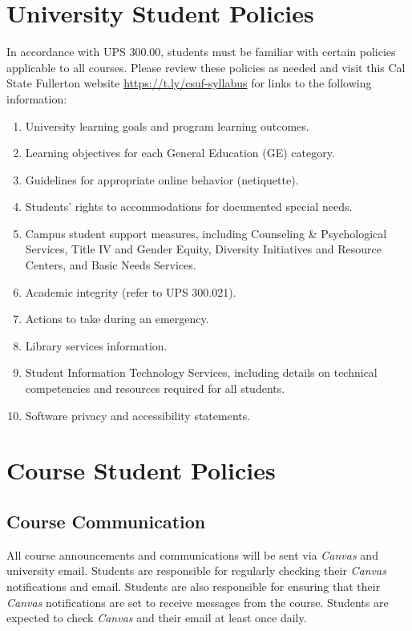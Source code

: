 \documentclass[12pt, letterpaper]{article}
\begin{document}
\section{University Student Policies}

In accordance with UPS 300.00, students must be familiar with certain policies applicable to all courses. Please review these policies as needed and visit this Cal State Fullerton website \href{https://t.ly/csuf-syllabus}{https://t.ly/csuf-syllabus} for links to the following information:

\begin{enumerate}
    \item   University learning goals and program learning outcomes.
    \item	Learning objectives for each General Education (GE) category.
    \item	Guidelines for appropriate online behavior (netiquette).
    \item	Students’ rights to accommodations for documented special needs.
    \item   Campus student support measures, including Counseling \& Psychological Services, Title IV and Gender Equity, Diversity Initiatives and Resource Centers, and Basic Needs Services.
    \item	Academic integrity (refer to UPS 300.021).
    \item	Actions to take during an emergency.
    \item	Library services information.
    \item	Student Information Technology Services, including details on technical competencies and resources required for all students.
    \item	Software privacy and accessibility statements.
\end{enumerate}

\section{Course Student Policies}

\subsection*{Course Communication}
All course announcements and communications will be sent via \emph{Canvas} and university email. Students are responsible for regularly checking their \emph{Canvas} notifications and email. Students are also responsible for ensuring that their \emph{Canvas} notifications are set to receive messages from the course. Students are expected to check \emph{Canvas} and their email at least once daily.
\end{document}
